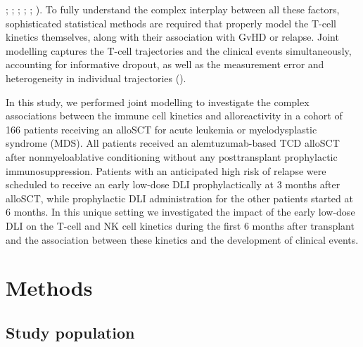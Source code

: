 \documentclass[
  letterpaper,
  DIV=11,
  numbers=noendperiod]{scrreprt}
\begin{document}
;
; ;
;
;
). To fully understand the complex interplay between all these
factors, sophisticated statistical methods are required that properly
model the T-cell kinetics themselves, along with their association with
GvHD or relapse. Joint modelling captures the T-cell trajectories and
the clinical events simultaneously, accounting for informative dropout,
as well as the measurement error and heterogeneity in individual
trajectories
().

In this study, we performed joint modelling to investigate the complex
associations between the immune cell kinetics and alloreactivity in a
cohort of 166 patients receiving an alloSCT for acute leukemia or
myelodysplastic syndrome (MDS). All patients received an
alemtuzumab-based TCD alloSCT after nonmyeloablative conditioning
without any posttransplant prophylactic immunosuppression. Patients with
an anticipated high risk of relapse were scheduled to receive an early
low-dose DLI prophylactically at 3 months after alloSCT, while
prophylactic DLI administration for the other patients started at 6
months. In this unique setting we investigated the impact of the early
low-dose DLI on the T-cell and NK cell kinetics during the first 6
months after transplant and the association between these kinetics and
the development of clinical events.

\section{Methods}\label{methods-2}

\subsection{Study population}\label{study-population}
\end{document}

